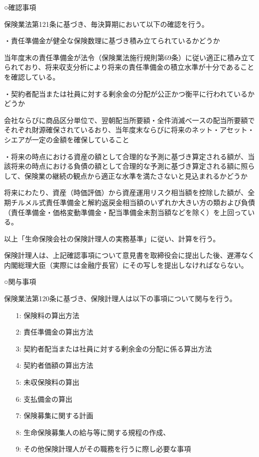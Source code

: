 \documentclass[report,gutter=10mm,fore-edge=10mm,uplatex,dvipdfmx]{jlreq}
\begin{document}
○確認事項

保険業法第121条に基づき、毎決算期において以下の確認を行う。

・責任準備金が健全な保険数理に基づき積み立てられているかどうか

当年度末の責任準備金が法令（保険業法施行規則第69条）に従い適正に積み立てられており、将来収支分析により将来の責任準備金の積立水準が十分であることを確認している。

・契約者配当または社員に対する剰余金の分配が公正かつ衡平に行われているかどうか

会社ならびに商品区分単位で、翌朝配当所要額・全件消滅べ一スの配当所要額でそれぞれ財源確保されているおり、当年度末ならびに将来のネット・アセット・シエアが一定の金額を確保していること

・将来の時点における資産の額として合理的な予測に基づき算定される額が、当該将来の時点における負債の額として合理的な予測に基づき算定される額に照らして、保険業の継続の観点から適正な水準を満たさないと見込まれるかどうか

将来にわたり、資産（時価評価）から資産運用リスク相当額を控除した額が、全期チルメル式責任準備金と解約返戻金相当額のいずれか大きい方の類および負債（責任準備金・価格変動準備金・配当準備金未割当額などを除く）を上回っている。

以上「生命保険会社の保険計理人の実務基準」に従い、計算を行う。

保険計理人は、上記確認事項について意見書を取締役会に提出した後、遅滞なく内閣総理大臣（実際には金融庁長官）にその写しを提出しなければならない。

○関与事項

保険業法第120条に基づき、保険計理人は以下の事項について関与を行う。

\begin{itemize}
 \item[1: ] 保険料の算出方法
 \item[2: ] 責任準備金の算出方法
 \item[3: ] 契約者配当または社員に対する剰余金の分配に係る算出方法
 \item[4: ] 契約者価額の算出方法
 \item[5: ] 未収保険料の算出
 \item[6: ] 支払備金の算出
 \item[7: ] 保険募集に関する計画
 \item[8: ] 生命保険募集人の給与等に関する規程の作成、
 \item[9: ] その他保険計理人がその職務を行うに際し必要な事項
\end{itemize}
\end{document}
